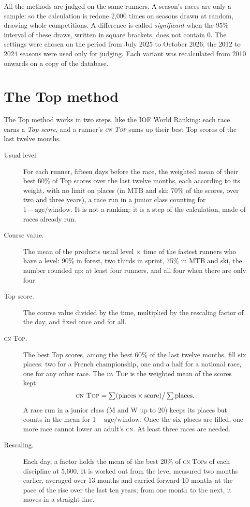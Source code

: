 \documentclass[11pt,a4paper]{article}
\newcommand{\Top}{\textsc{Top}}
\newcommand{\CN}{\textsc{cn}}
\begin{document}
All the methods are judged on the same runners. A season's races are only a sample: so the calculation is redone 2,000 times on seasons drawn at random, drawing whole competitions. A difference is called \emph{significant} when the 95\% interval of these draws, written in square brackets, does not contain 0. The settings were chosen on the period from July 2025 to October 2026; the 2012 to 2024 seasons were used only for judging. Each variant was recalculated from 2010 onwards on a copy of the database.

\section{The Top method}

The Top method works in two steps, like the IOF World Ranking: each race earns a \emph{Top score}, and a runner's \emph{\CN{} \Top} sums up their best Top scores of the last twelve months.

\begin{description}
  \item[Usual level.] For each runner, fifteen days before the race, the weighted mean of their best 60\% of Top scores over the last twelve months, each according to its weight, with no limit on places (in MTB and ski: 70\% of the scores, over two and three years), a race run in a junior class counting for $1 - \text{age} / \text{window}$. It is not a ranking: it is a step of the calculation, made of races already run.
  \item[Course value.] The mean of the products usual level $\times$ time of the fastest runners who have a level: 90\% in forest, two thirds in sprint, 75\% in MTB and ski, the number rounded up; at least four runners, and all four when there are only four.
  \item[Top score.] The course value divided by the time, multiplied by the rescaling factor of the day, and fixed once and for all.
  \item[\CN{} \Top.] The best Top scores, among the best 60\% of the last twelve months, fill six places: two for a French championship, one and a half for a national race, one for any other race. The \CN{} \Top{} is the weighted mean of the scores kept:
  \[ \text{\CN{} \Top} = \textstyle\sum (\text{places} \times \text{score}) \big/ \sum \text{places} . \]
  A race run in a junior class (M and W up to 20) keeps its places but counts in the mean for $1 - \text{age} / \text{window}$. Once the six places are filled, one more race cannot lower an adult's \CN. At least three races are needed.
  \item[Rescaling.] Each day, a factor holds the mean of the best 20\% of \CN{} \Top s of each discipline at 5,600. It is worked out from the level measured two months earlier, averaged over 13 months and carried forward 10 months at the pace of the rise over the last ten years; from one month to the next, it moves in a straight line.
\end{description}
\end{document}
